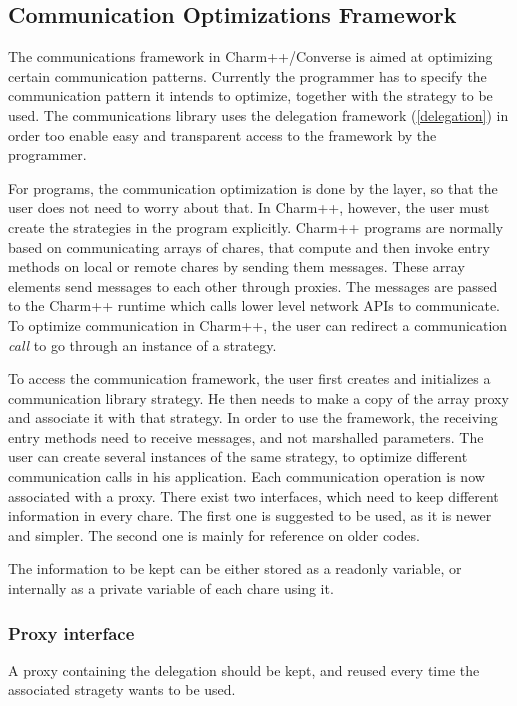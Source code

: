\subsection{Communication Optimizations Framework}

The communications framework in Charm++/Converse is aimed at optimizing certain
communication patterns. Currently the programmer has to specify the
communication pattern it intends to optimize, together with the strategy to be
used. The communications library uses the delegation framework (\ref{delegation}) in order too
enable easy and transparent access to the framework by the programmer.

For \ampi{} programs, the communication optimization is done by the \ampi{}
layer, so that the user does not need to worry about that. In Charm++, however,
the user must create the strategies in the program explicitly. Charm++ programs
are normally based on communicating arrays of chares, that compute and then
invoke entry methods on local or remote chares by sending them messages. These
array elements send messages to each other through proxies. The messages are
passed to the Charm++ runtime which calls lower level network APIs to
communicate. To optimize communication in Charm++, the user can redirect a
communication {\em call} to go through an instance of a strategy.

To access the communication framework, the user first creates and initializes a
communication library strategy. He then needs to make a copy of the array proxy
and associate it with that strategy. In order to use the framework, the
receiving entry methods need to receive messages, and not marshalled parameters.
The user can create several instances of the same strategy, to optimize
different communication calls in his application. Each communication operation
is now associated with a proxy. There exist two interfaces, which need to keep
different information in every chare. The first one is suggested to be used, as
it is newer and simpler. The second one is mainly for reference on older codes.

The information to be kept can be either stored as a readonly variable, or
internally as a private variable of each chare using it.

\subsubsection{Proxy interface}

A proxy containing the delegation should be kept, and reused every time the
associated stragety wants to be used.


